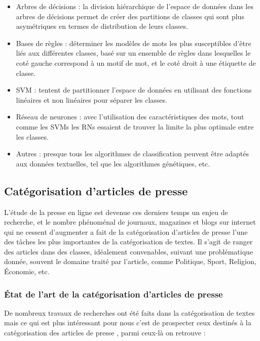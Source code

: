     \begin{itemize}[leftmargin={0.7cm}]
        \item Arbres de décisions : la division hiérarchique de l'espace de données dans les arbres de décisions permet de créer des partitions de classes qui sont plus asymétriques en termes de distribution de leurs classes.

        \item Bases de règles : déterminer les modèles de mots les plus susceptibles d'être liés aux différentes classes, basé sur un ensemble de règles dans lesquelles le coté gauche correspond à un motif de mot, et le coté droit à une étiquette de classe.

        \item SVM : tentent de partitionner l'espace de données en utilisant des fonctions linéaires et non linéaires pour séparer les classes.

        \item Réseau de neurones : avec l'utilisation des caractéristiques des mots, tout comme les SVMs les RNs essaient de trouver la limite la plus optimale entre les classes.

        \item Autres : presque tous les algorithmes de classification peuvent être adaptés aux données textuelles, tel que les algorithmes génétiques, etc.
    \end{itemize}


    \subsection{Catégorisation d'articles de presse}
     L’étude de la presse en ligne est devenue ces derniers temps un enjeu de recherche, et le nombre phénoménal de journaux, magazines et blogs sur internet qui ne cessent d'augmenter a fait de la catégorisation d'articles de presse l'une des tâches les plus importantes de la catégorisation de textes. Il s'agit de ranger des articles dans des classes, idéalement convenables, suivant une problématique donnée, souvent le domaine traité par l'article, comme Politique, Sport, Religion, Économie, etc.

    \subsubsection{État de l'art de la catégorisation d'articles de presse}
    
      De nombreux travaux de recherches ont été faits dans la catégorisation de textes mais ce qui est plus intéressant pour nous c'est de prospecter ceux destinés à la catégorisation des articles de presse \cite{itemetat0}, parmi ceux-là on retrouve :
     
